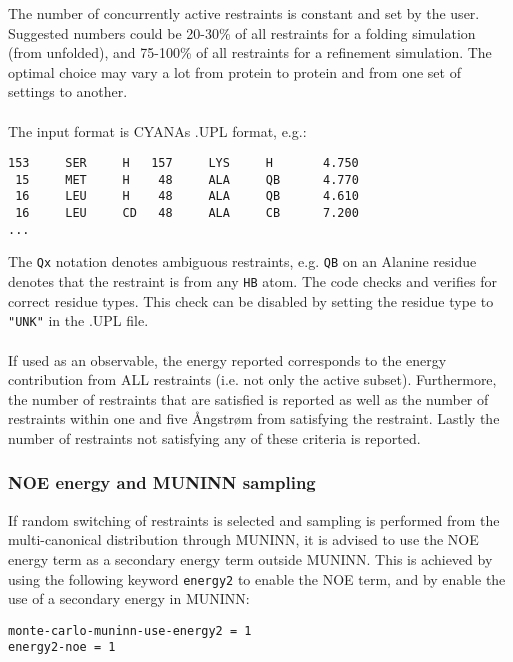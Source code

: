 The number of concurrently active restraints is constant and set by the user.
Suggested numbers could be 20-30\% of all restraints for a folding simulation (from unfolded), and 75-100\% of all restraints for a refinement simulation.
The optimal choice may vary a lot from protein to protein and from one set of settings to another.
\\\\The input format is CYANAs .UPL format, e.g.:
\begin{verbatim}
153     SER     H   157     LYS     H       4.750
 15     MET     H    48     ALA     QB      4.770
 16     LEU     H    48     ALA     QB      4.610
 16     LEU     CD   48     ALA     CB      7.200
...
\end{verbatim}
The \texttt{Qx} notation denotes ambiguous restraints, e.g. \texttt{QB} on an Alanine residue denotes that the restraint is from any \texttt{HB} atom.
The code checks and verifies for correct residue types.
This check can be disabled by setting the residue type to \texttt{"UNK"} in the .UPL file. 
\\\\If used as an observable, the energy reported corresponds to the energy contribution from ALL restraints (i.e. not only the active subset). Furthermore, the number of restraints that are satisfied is reported as well as the number of restraints within one and five \AA ngstr\o m from satisfying the restraint. Lastly the number of restraints not satisfying any of these criteria is reported.

\subsubsection*{NOE energy and MUNINN sampling}
If random switching of restraints is selected and sampling is performed from the multi-canonical distribution through MUNINN, it is advised to use the NOE energy term as a secondary energy term outside MUNINN. 
This is achieved by using the following keyword \texttt{energy2} to enable the NOE term, and by enable the use of a secondary energy in MUNINN:
\begin{verbatim}
monte-carlo-muninn-use-energy2 = 1
energy2-noe = 1
\end{verbatim}
\begin{optiontable}
\end{optiontable}
